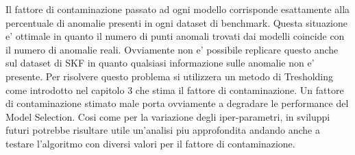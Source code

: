 Il fattore di contaminazione passato ad ogni modello corrisponde esattamente alla percentuale di anomalie presenti in ogni dataset di benchmark. Questa situazione e' ottimale in quanto il numero di punti anomali trovati dai modelli coincide con il numero di anomalie reali. Ovviamente non e' possibile replicare questo anche sul dataset di SKF in quanto qualsiasi informazione sulle anomalie non e' presente. Per risolvere questo problema si utilizzera un metodo di Tresholding come introdotto nel capitolo 3 che stima il fattore di contaminazione. Un fattore di contaminazione stimato male porta ovviamente a degradare le performance del Model Selection. Cosi come per la variazione degli iper-parametri, in sviluppi futuri potrebbe risultare utile un'analisi piu approfondita andando anche a testare l'algoritmo con diversi valori per il fattore di contaminazione.


